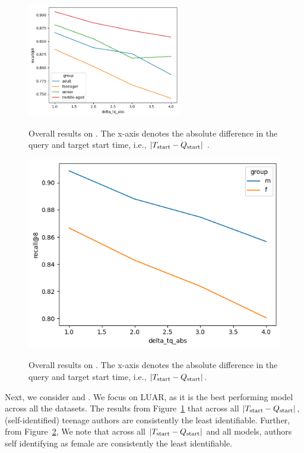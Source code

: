 \begin{figure}
    \centering
    \includegraphics[width=0.6\textwidth,alt={Line plot showing interaction of age and time.}]{stylometryExtensions/figures/demo/varydelta_demographic_groupwise_age.png}
    \caption{Overall results on \DSagevary{}. The x-axis denotes the absolute difference in the query and target start time, i.e., $|T_{\rm{start}} - Q_{\rm{start}}|$ .}
    \label{fig:demographic_vary:age}
\end{figure}

\begin{figure}
    \centering
    \includegraphics[height=0.6\textwidth,alt={Line plot showing interaction of gender and time.}]{stylometryExtensions/figures/demo/varydelta_demographic_groupwise_gender.png}
    \caption{Overall results on \DSgendervary{}. The x-axis denotes the absolute difference in the query and target start time, i.e., $|T_{\rm{start}} - Q_{\rm{start}}|$. }
    \label{fig:demographic_vary:gender}
\end{figure}

Next, we consider \DSagevary{} and \DSgendervary{}.
We focus on LUAR, as it is the best performing model across all the datasets.
The results from Figure~\ref{fig:demographic_vary:age} that across all $|T_{\rm{start}} - Q_{\rm{start}}|$, (self-identified) teenage authors are consistently the least identifiable.
Further, from Figure~\ref{fig:demographic_vary:gender}, We note that across all $|T_{\rm{start}} - Q_{\rm{start}}|$ and all models, authors self identifying as female are consistently the least identifiable.


